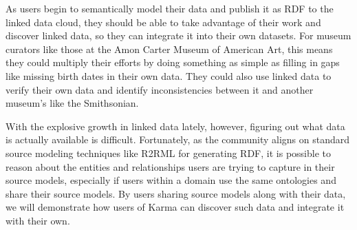 As users begin to semantically model their data and publish it as RDF to the linked data cloud, they should be able to take advantage of their work and discover linked data, so they can integrate it into their own datasets.  
For museum curators like those at the Amon Carter Museum of American Art, this means they could multiply their efforts by doing something as simple as filling in gaps like missing birth dates in their own data. 
They could also use linked data to verify their own data and identify inconsistencies between it and another museum's like the Smithsonian. \cite{knoblock12:eswc}

With the explosive growth in linked data lately, however, figuring out what data is actually available is difficult.
Fortunately, as the community aligns on standard source modeling techniques like R2RML for generating RDF, it is possible to reason about the entities and relationships users are trying to capture in their source models, especially if users within a domain use the same ontologies and share their source models.
By users sharing source models along with their data, we will demonstrate how users of Karma can discover such data and integrate it with their own.
